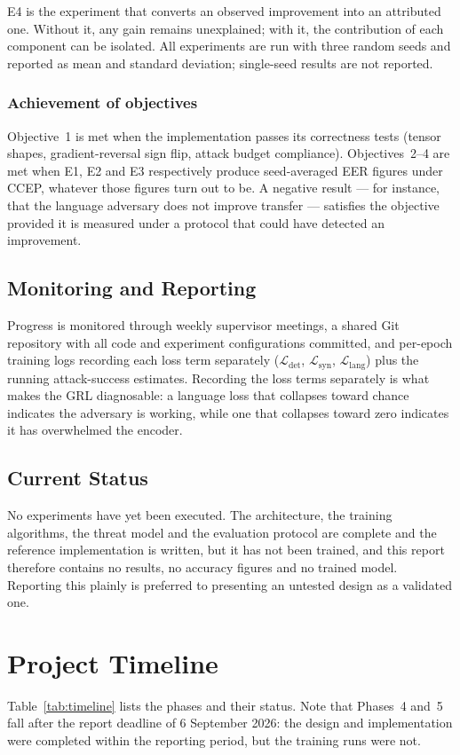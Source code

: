 \documentclass[conference]{IEEEtran}
\newcommand{\Loss}{\mathcal{L}}
\begin{document}
E4 is the experiment that converts an observed improvement into an attributed
one. Without it, any gain remains unexplained; with it, the contribution of
each component can be isolated. All experiments are run with three random
seeds and reported as mean and standard deviation; single-seed results are not
reported.

\subsubsection{Achievement of objectives}
Objective~1 is met when the implementation passes its correctness tests
(tensor shapes, gradient-reversal sign flip, attack budget compliance).
Objectives~2--4 are met when E1, E2 and E3 respectively produce
seed-averaged EER figures under CCEP, whatever those figures turn out to be.
A negative result --- for instance, that the language adversary does not
improve transfer --- satisfies the objective provided it is measured under a
protocol that could have detected an improvement.

\subsection{Monitoring and Reporting}
Progress is monitored through weekly supervisor meetings, a shared Git
repository with all code and experiment configurations committed, and
per-epoch training logs recording each loss term separately
($\Loss_{\mathrm{det}}$, $\Loss_{\mathrm{syn}}$, $\Loss_{\mathrm{lang}}$) plus
the running attack-success estimates. Recording the loss terms separately is
what makes the GRL diagnosable: a language loss that collapses toward chance
indicates the adversary is working, while one that collapses toward zero
indicates it has overwhelmed the encoder.

\subsection{Current Status}
No experiments have yet been executed. The architecture, the training
algorithms, the threat model and the evaluation protocol are complete and the
reference implementation is written, but it has not been trained, and this
report therefore contains no results, no accuracy figures and no trained
model. Reporting this plainly is preferred to presenting an untested design as
a validated one.

\section{Project Timeline}
Table~\ref{tab:timeline} lists the phases and their status. Note that
Phases~4 and~5 fall after the report deadline of 6 September 2026: the design
and implementation were completed within the reporting period, but the
training runs were not.
\end{document}
